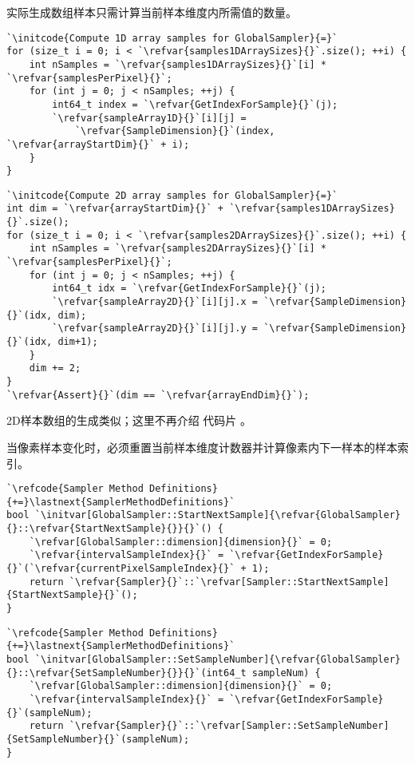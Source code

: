 实际生成数组样本只需计算当前样本维度内所需值的数量。
\begin{lstlisting}
`\initcode{Compute 1D array samples for GlobalSampler}{=}`
for (size_t i = 0; i < `\refvar{samples1DArraySizes}{}`.size(); ++i) {
    int nSamples = `\refvar{samples1DArraySizes}{}`[i] * `\refvar{samplesPerPixel}{}`;
    for (int j = 0; j < nSamples; ++j) {
        int64_t index = `\refvar{GetIndexForSample}{}`(j);
        `\refvar{sampleArray1D}{}`[i][j] =
            `\refvar{SampleDimension}{}`(index, `\refvar{arrayStartDim}{}` + i);
    }
}
\end{lstlisting}
\begin{lstlisting}
`\initcode{Compute 2D array samples for GlobalSampler}{=}`
int dim = `\refvar{arrayStartDim}{}` + `\refvar{samples1DArraySizes}{}`.size();
for (size_t i = 0; i < `\refvar{samples2DArraySizes}{}`.size(); ++i) {
    int nSamples = `\refvar{samples2DArraySizes}{}`[i] * `\refvar{samplesPerPixel}{}`;
    for (int j = 0; j < nSamples; ++j) {
        int64_t idx = `\refvar{GetIndexForSample}{}`(j);
        `\refvar{sampleArray2D}{}`[i][j].x = `\refvar{SampleDimension}{}`(idx, dim);
        `\refvar{sampleArray2D}{}`[i][j].y = `\refvar{SampleDimension}{}`(idx, dim+1);
    }
    dim += 2;
}
`\refvar{Assert}{}`(dim == `\refvar{arrayEndDim}{}`);
\end{lstlisting}

2D样本数组的生成类似；这里不再介绍
代码片
。

当像素样本变化时，必须重置当前样本维度计数器并计算像素内下一样本的样本索引。
\begin{lstlisting}
`\refcode{Sampler Method Definitions}{+=}\lastnext{SamplerMethodDefinitions}`
bool `\initvar[GlobalSampler::StartNextSample]{\refvar{GlobalSampler}{}::\refvar{StartNextSample}{}}{}`() {
    `\refvar[GlobalSampler::dimension]{dimension}{}` = 0;
    `\refvar{intervalSampleIndex}{}` = `\refvar{GetIndexForSample}{}`(`\refvar{currentPixelSampleIndex}{}` + 1);
    return `\refvar{Sampler}{}`::`\refvar[Sampler::StartNextSample]{StartNextSample}{}`();
}
\end{lstlisting}
\begin{lstlisting}
`\refcode{Sampler Method Definitions}{+=}\lastnext{SamplerMethodDefinitions}`
bool `\initvar[GlobalSampler::SetSampleNumber]{\refvar{GlobalSampler}{}::\refvar{SetSampleNumber}{}}{}`(int64_t sampleNum) {
    `\refvar[GlobalSampler::dimension]{dimension}{}` = 0;
    `\refvar{intervalSampleIndex}{}` = `\refvar{GetIndexForSample}{}`(sampleNum);
    return `\refvar{Sampler}{}`::`\refvar[Sampler::SetSampleNumber]{SetSampleNumber}{}`(sampleNum);
}
\end{lstlisting}

